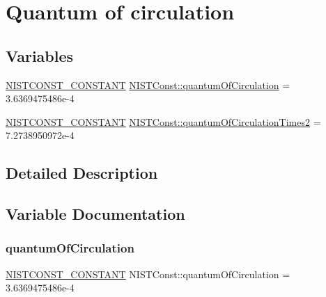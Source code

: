 \hypertarget{group___n_i_s_t_const-_quantum_of_circulation}{}\section{Quantum of circulation}
\label{group___n_i_s_t_const-_quantum_of_circulation}
\subsection*{Variables}
\begin{DoxyCompactItemize}
\item 
\mbox{\hyperlink{_n_i_s_t_const_8hpp_a2b0fc1d7452373f816175dd86ce26729}{N\+I\+S\+T\+C\+O\+N\+S\+T\+\_\+\+C\+O\+N\+S\+T\+A\+NT}} \mbox{\hyperlink{group___n_i_s_t_const-_quantum_of_circulation_ga094718adb489915f76f46d2b8526ddad}{N\+I\+S\+T\+Const\+::quantum\+Of\+Circulation}} = 3.\+6369475486e-\/4
\item 
\mbox{\hyperlink{_n_i_s_t_const_8hpp_a2b0fc1d7452373f816175dd86ce26729}{N\+I\+S\+T\+C\+O\+N\+S\+T\+\_\+\+C\+O\+N\+S\+T\+A\+NT}} \mbox{\hyperlink{group___n_i_s_t_const-_quantum_of_circulation_ga4d7993b701441cde35cd27b7175874c3}{N\+I\+S\+T\+Const\+::quantum\+Of\+Circulation\+Times2}} = 7.\+2738950972e-\/4
\end{DoxyCompactItemize}


\subsection{Detailed Description}


\subsection{Variable Documentation}
\mbox{\label{group___n_i_s_t_const-_quantum_of_circulation_ga094718adb489915f76f46d2b8526ddad}} 
\subsubsection{\texorpdfstring{quantum\+Of\+Circulation}{quantumOfCirculation}}
{\footnotesize\ttfamily \mbox{\hyperlink{_n_i_s_t_const_8hpp_a2b0fc1d7452373f816175dd86ce26729}{N\+I\+S\+T\+C\+O\+N\+S\+T\+\_\+\+C\+O\+N\+S\+T\+A\+NT}} N\+I\+S\+T\+Const\+::quantum\+Of\+Circulation = 3.\+6369475486e-\/4}

